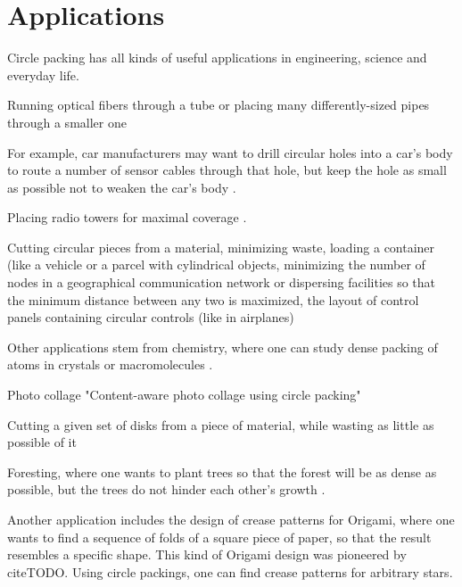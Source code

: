 \section{Applications}

Circle packing has all kinds of useful applications in engineering, science and everyday life.


Running optical fibers through a tube or placing many differently-sized pipes through a smaller one \parencite{WHZX2002improved}

For example, car manufacturers may want to drill circular holes into a car's body to route a number of sensor cables through that hole, but keep the hole as small as possible not to weaken the car's body \cite{SSSKK2004disk}.

Placing radio towers for maximal coverage \parencite{SMCSCG2007new}.

Cutting circular pieces from a material, minimizing waste, loading a container (like a vehicle or a parcel with cylindrical objects, minimizing the number of nodes in a geographical communication network or dispersing facilities so that the minimum distance between any two is maximized, the layout of control panels containing circular controls (like in airplanes) \parencite{CKP2008solving}

Other applications stem from chemistry, where one can study dense packing of atoms in crystals or macromolecules \cite{WMP1994history}.

Photo collage "Content-aware photo
collage using circle packing"

Cutting a given set of disks from a piece of material, while wasting as little as possible of it \cite{SMCSCG2007new}

Foresting, where one wants to plant trees so that the forest will be as dense as possible, but the trees do not hinder each other's growth \cite{SMCSCG2007new}.



Another application includes the design of crease patterns for Origami, where one wants to find a sequence of folds of a square piece of paper, so that the result resembles a specific shape. This kind of Origami design was pioneered by citeTODO. Using circle packings, one can find crease patterns for arbitrary stars.
